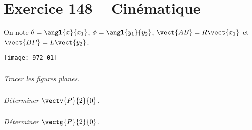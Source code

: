 \section*{Exercice 148 -- Cinématique}
\setcounter{exo}{0}

On note $\theta=\angl{x}{x_1}$, $\phi=\angl{y_1}{y_2}$, 
$\vect{AB}=R\vect{x_1}$ et $\vect{BP}=L\vect{y_2}$.

\begin{center}
\texttt{[image: 972\_01]}
\end{center}

\subparagraph{}
\textit{Tracer les figures planes.}
\ifprof
\begin{corrige}

\end{corrige}
\else
\fi

\subparagraph{}
\textit{Déterminer $\vectv{P}{2}{0}$.}
\ifprof
\begin{corrige}

\end{corrige}
\else
\fi

\subparagraph{}
\textit{Déterminer $\vectg{P}{2}{0}$.}
\ifprof
\begin{corrige}

\end{corrige}
\else
\fi
